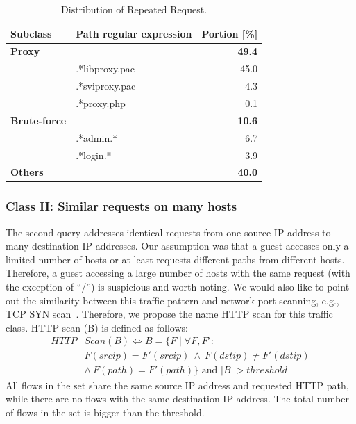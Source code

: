 \begin{table}[ht]
\centering
\begin{tabular}{l l r}
Subclass & Path regular expression & Portion [\%] \\
\hline
\textbf{Proxy} & & \textbf{49.4} \\
& .*libproxy.pac & 45.0 \\
& .*sviproxy.pac &  4.3 \\
& .*proxy.php    &  0.1 \\
\hline
\textbf{Brute-force} & & \textbf{10.6} \\
& .*admin.*            &  6.7 \\
& .*login.*            &  3.9 \\
\hline
\textbf{Others} & & \textbf{40.0} \\
\end{tabular}
\caption{Distribution of Repeated Request.}
\label{tab:httpsecurity-repeat-statistics}
\end{table}

\subsubsection{Class II: Similar requests on many hosts}

The second query addresses identical requests from one source IP address to many destination IP addresses. Our assumption was that a guest accesses only a limited number of hosts or at least requests different paths from different hosts. Therefore, a guest accessing a large number of hosts with the same request (with the exception of ``/'') is suspicious and worth noting. We would also like to point out the similarity between this traffic pattern and network port scanning, e.g., TCP SYN scan~\cite{Bhuyan-2011-Surveying}. Therefore, we propose the name HTTP scan for this traffic class. HTTP scan (B) is defined as follows:
\begin{equation*}
\begin{split}
HTTP&Scan(B) \iff B = \{F \mid \forall F, F':\\
&F(srcip) = F'(srcip) \: \land \: F(dstip) \neq F'(dstip)\\
&\land \: F(path) = F'(path) \} \mbox{ and } |B| > threshold
\end{split}
\end{equation*}
All flows in the set share the same source IP address and requested HTTP path, while there are no flows with the same destination IP address. The total number of flows in the set is bigger than the threshold.

